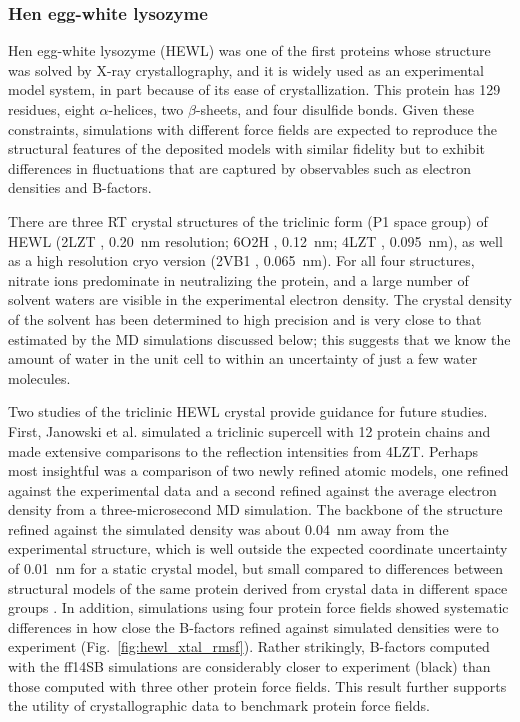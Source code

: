 \documentclass[9pt,review]{livecoms}
\begin{document}
\subsubsection{Hen egg-white lysozyme}
\label{sub2:hewl}

Hen egg-white lysozyme (HEWL) was one of the first proteins whose structure was solved by X-ray crystallography, and it is widely used as an experimental model system, in part because of its ease of crystallization.
This protein has 129 residues, eight $\alpha$-helices, two $\beta$-sheets, and four disulfide bonds.
Given these constraints, simulations with different force fields are expected to reproduce the structural features of the deposited models with similar fidelity but to exhibit differences in fluctuations that are captured by observables such as electron densities and B-factors.

There are three RT crystal structures of the triclinic form (P1 space group) of HEWL (2LZT \cite{ramanadham_refinement_1990}, \qty{0.20}{\nano\meter} resolution; 6O2H \cite{meisburger_diffuse_2020}, \qty{0.12}{\nano\meter}; 4LZT \cite{walsh_refinement_1998}, \qty{0.095}{\nano\meter}), as well as a high resolution cryo version (2VB1 \cite{wang_triclinic_2007}, \qty{0.065}{\nano\meter}).
For all four structures, nitrate ions predominate in neutralizing the protein, and a large number of solvent waters are visible in the experimental electron density.
The crystal density of the solvent has been determined to high precision \cite{moreau_ice_2020} and is very close to that estimated by the MD simulations discussed below; this suggests that we know the amount of water in the unit cell to within an uncertainty of just a few water molecules. 

Two studies of the triclinic HEWL crystal provide guidance for future studies.
First, Janowski et al. \cite{janowski_molecular_2016} simulated a triclinic supercell with 12 protein chains and made extensive comparisons to the reflection intensities from 4LZT.
Perhaps most insightful was a comparison of two newly refined atomic models, one refined against the experimental data and a second refined against the average electron density from a three-microsecond MD simulation.
The backbone of the structure refined against the simulated density was about \qty{0.04}{\nano\meter} away from the experimental structure, which is well outside the expected coordinate uncertainty of \qty{0.01}{\nano\meter} for a static crystal model, but small compared to differences between structural models of the same protein derived from crystal data in different space groups \cite{kovalevskiy_alphafold_2024}.
In addition, simulations using four protein force fields showed systematic differences in how close the B-factors refined against simulated densities were to experiment (Fig.~\ref{fig:hewl_xtal_rmsf}). Rather strikingly, B-factors computed with the ff14SB simulations are considerably closer to experiment (black) than those computed with three other protein force fields. This result further supports the utility of crystallographic data to benchmark protein force fields.
\end{document}
